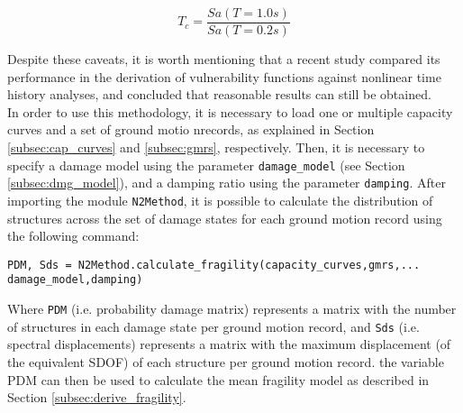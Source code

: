 \begin{equation}
T_c = \frac{Sa(T=1.0s)}{Sa(T=0.2s)}
\end{equation}

Despite these caveats, it is worth mentioning that a recent study \citep{SilvaEtAl2014b} compared its performance in the derivation of vulnerability functions against nonlinear time history analyses, and concluded that reasonable results can still be obtained.\\

In order to use this methodology, it is necessary to load one or multiple capacity curves and a set of ground motio nrecords, as explained in Section \ref{subsec:cap_curves} and \ref{subsec:gmrs}, respectively. Then, it is necessary to specify a damage model using the parameter \verb=damage_model= (see Section \ref{subsec:dmg_model}), and a damping ratio using the parameter \verb=damping=. After importing the module \verb=N2Method=, it is possible to calculate the distribution of structures across the set of damage states for each ground motion record using the following command:

\begin{Verbatim}[frame=single, commandchars=\\\{\}, samepage=true]
PDM, Sds = N2Method.calculate_fragility(capacity_curves,gmrs,...
damage_model,damping)
\end{Verbatim}

Where \verb=PDM= (i.e. probability damage matrix) represents a matrix with the number of structures in each damage state per ground motion record, and \verb=Sds= (i.e. spectral displacements) represents a matrix with the maximum displacement (of the equivalent SDOF) of each structure per ground motion record. the variable PDM can then be used to calculate the mean fragility model as described in Section \ref{subsec:derive_fragility}.
